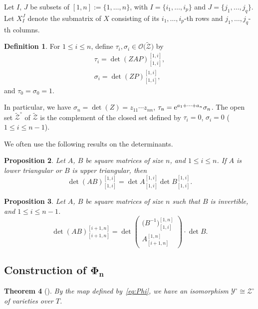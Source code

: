 \documentclass[10pt,a4paper]{amsart}
\numberwithin{equation}{section}
\renewcommand{\O}{\mathscr{O}}
\newtheorem{Theorem}{Theorem}[section]
\newtheorem{Proposition}[Theorem]{Proposition}
\theoremstyle{definition}
\newtheorem{Definition}[Theorem]{Definition}
\begin{document}
Let $I$, $J$ be subsets of $[1,n]:=\{1,\dots,n\}$,
with $I=\{i_1,\dots,i_p\}$ and $J=\{j_1,\dots,j_q\}$.
Let
$X^{J}_{I}$ denote the submatrix of $X$ consisting of its $i_1,\dots,i_p$-th rows and $j_1,\dots,j_q$-th columns.
\begin{Definition}
For $1\le i\le n$, define $\tau_i, \sigma_i\in \O\bigl(\tilde{\mathscr{Z}}\bigr)$ by
\begin{gather}\label{eq:def_of_tau}
\tau_i=
\det(ZAP)^{[1,i]}_{[1,i]},\\
\label{eq:def_of_sigma_i}
\sigma_i
=
\det(ZP)^{[1,i]}_{[1,i]},
\end{gather}
and $\tau_0=\sigma_0=1$.
\end{Definition}
In particular, we have
$
\sigma_n=\det(Z)=z_{11}\cdots z_{nn}$, $
\tau_n={\rm e}^{a_1+\dots+a_n}\sigma_n$.
The open set $\tilde{\mathscr{Z}}^\circ$
of $\tilde{\mathscr{Z}}$ is
the complement of the closed set defined by
$\tau_i= 0$, $\sigma_i=0$ ($1\le i\le n-1$).




We often use the following results on
the determinants.
\begin{Proposition}\label{prop:Noumi}
Let $A$, $B$ be square matrices of size $n$, and $1\le i\le n$.
If $A$ is lower triangular or $B$ is upper triangular, then
\[
\det(AB)^{[1,i]}_{[1,i]}=\det A^{[1,i]}_{[1,i]}
\det B^{[1,i]}_{[1,i]}.
\]
\end{Proposition}


\begin{Proposition}\label{prop:det AB partial}
Let $A$, $B$ be square matrices of size $n$ such that $B$ is invertible, and $1\le i\le n-1$.
\[
\det(AB)^{[i+1,n]}_{[i+1,n]}
=\det\left(
\begin{matrix}
\bigl(B^{-1}\bigr)^{[1,n]}_{[1,i]}\\\hline
A^{[1,n]}_{[i+1,n]}
\end{matrix}
\right)\cdot \det B.
\]
\end{Proposition}


\subsection[Construction of Phi\_n]{Construction of $\boldsymbol{\Phi_n}$}
\begin{Theorem}[{\cite[Section~3]{IIM}}]By the map defined by~\eqref{eq:Phi}, we have
an isomorphism
$\mathscr{Y}^\circ\cong \mathscr{Z}^\circ$
of varieties over $T$.
\end{Theorem}
\end{document}
